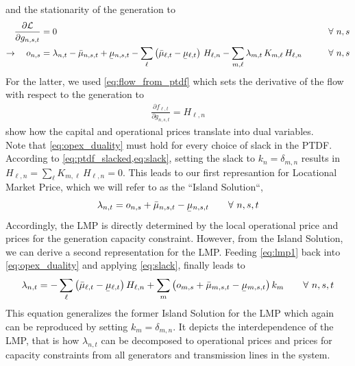 \documentclass[11pt]{article}
\newcommand{\ubar}[1]{\underaccent{\bar}{#1}}
\newcommand{\generation}[1][n]{g_{#1,s,t}}
\newcommand{\opexGeneration}[1][n]{o_{#1,s}}
\newcommand{\incidence}[1][n]{K_{#1,\ell}}
\newcommand{\ptdf}[1][n]{H_{\ell,#1}}
\newcommand{\slack}[1][n]{k_{#1}}
\newcommand{\mulowergeneration}[1][n]{\ubar{\mu}_{#1,s,t}}
\newcommand{\muuppergeneration}[1][n]{\bar{\mu}_{#1,s,t}}
\newcommand{\mulowerflow}{\ubar{\mu}_{\ell,t}}
\newcommand{\muupperflow}{\bar{\mu}_{\ell,t}}
\newcommand{\lmp}[1][n]{\lambda_{#1,t}}
\newcommand{\flow}{f_{\ell,t}}
\newcommand{\lagrangian}{\mathcal{L}}
\newcommand{\Forall}[1]{\hspace{20pt} \forall \,\, #1 }
\newcommand{\pdv}[2]{\frac{\partial #1}{\partial #2}}
\begin{document}
and the stationarity of the generation to 
\begin{align}
 \pdv{\lagrangian}{\generation} &= 0  &\Forall{n,s} \\
 \rightarrow \hspace{10pt}  \opexGeneration &=  \lmp - \muuppergeneration + \mulowergeneration - \sum_{\ell} \left( \muupperflow - \mulowerflow\right)  \, \ptdf - \sum_{m,\ell}\lmp[m] \, \incidence[m] \, \ptdf   &\Forall{n,s} \label{eq:opex_duality}
\end{align}
% 
For the latter, we used \cref{eq:flow_from_ptdf} which sets the derivative of the flow with respect to the generation to 
\begin{align}
\pdv{\flow}{\generation} = \ptdf                                                                                                                                                   \end{align}
 show how the capital and operational prices translate into dual variables. \\

Note that \cref{eq:opex_duality} must hold for every choice of slack in the PTDF. According to \cref{eq:ptdf_slacked,eq:slack}, setting the slack to $\slack = \delta_{m,n}$ results in $\ptdf = \sum_\ell \incidence[m] \, \ptdf = 0$. This leads to our first represantion for Locational Market Price, which we will refer to as the ``Island Solution``,
\begin{align}
\lmp  =  \opexGeneration + \muuppergeneration - \mulowergeneration \Forall{n,s,t}
\label{eq:lmp1}
\end{align}
Accordingly, the LMP is directly determined by the local operational price and prices for the generation capacity constraint. 
However, from the Island Solution, we can derive a second representation for the LMP. Feeding \cref{eq:lmp1} back into \cref{eq:opex_duality} and applying \cref{eq:slack}, finally leads to 
\begin{align}
\lmp =  - \sum_\ell \left( \muupperflow - \mulowerflow\right) \ptdf + \sum_m \left( \opexGeneration[m] + \muuppergeneration[m] - \mulowergeneration[m] \right) \slack[m] \Forall{n,s,t} 
\label{eq:lmp2}
\end{align}
This equation generalizes the former Island Solution for the LMP which again can be reproduced by setting $\slack[m] = \delta_{m,n}$. It depicts the interdependence of the LMP, that is how $\lmp$ can be decomposed to operational prices and prices for capacity constraints from all generators and transmission lines in the system. 
\end{document}
